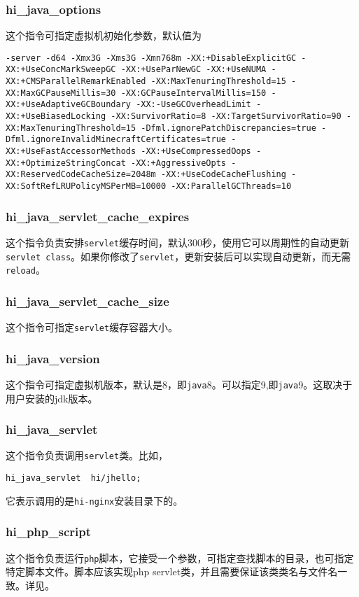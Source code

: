 \subsubsection{hi_java_options}
这个指令可指定虚拟机初始化参数，默认值为

\begin{lstlisting}
-server -d64 -Xmx3G -Xms3G -Xmn768m -XX:+DisableExplicitGC -XX:+UseConcMarkSweepGC -XX:+UseParNewGC -XX:+UseNUMA -XX:+CMSParallelRemarkEnabled -XX:MaxTenuringThreshold=15 -XX:MaxGCPauseMillis=30 -XX:GCPauseIntervalMillis=150 -XX:+UseAdaptiveGCBoundary -XX:-UseGCOverheadLimit -XX:+UseBiasedLocking -XX:SurvivorRatio=8 -XX:TargetSurvivorRatio=90 -XX:MaxTenuringThreshold=15 -Dfml.ignorePatchDiscrepancies=true -Dfml.ignoreInvalidMinecraftCertificates=true -XX:+UseFastAccessorMethods -XX:+UseCompressedOops -XX:+OptimizeStringConcat -XX:+AggressiveOpts -XX:ReservedCodeCacheSize=2048m -XX:+UseCodeCacheFlushing -XX:SoftRefLRUPolicyMSPerMB=10000 -XX:ParallelGCThreads=10
\end{lstlisting}

\subsubsection{hi_java_servlet_cache_expires}
这个指令负责安排\texttt{servlet}缓存时间，默认300秒，使用它可以周期性的自动更新\texttt{servlet class}。如果你修改了\texttt{servlet}，更新安装后可以实现自动更新，而无需\texttt{reload}。
\subsubsection{hi_java_servlet_cache_size}
这个指令可指定\texttt{servlet}缓存容器大小。
\subsubsection{hi_java_version}
这个指令可指定虚拟机版本，默认是8，即\texttt{java}8。可以指定9,即\texttt{java}9。这取决于用户安装的jdk版本。
\subsubsection{hi_java_servlet}
这个指令负责调用\texttt{servlet}类。比如，
\begin{lstlisting}
hi_java_servlet  hi/jhello;
\end{lstlisting}
它表示调用的是\texttt{hi-nginx}安装目录下的。

\subsubsection{hi_php_script}
这个指令负责运行\texttt{php}脚本，它接受一个参数，可指定查找脚本的目录，也可指定特定脚本文件。脚本应该实现php servlet类，并且需要保证该类类名与文件名一致。详见。
















